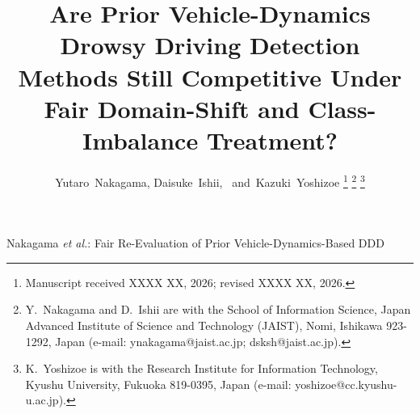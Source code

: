 \documentclass[lettersize,journal]{IEEEtran}
\begin{document}
\title{Are Prior Vehicle-Dynamics Drowsy Driving Detection Methods Still Competitive Under Fair Domain-Shift and Class-Imbalance Treatment?}

\author{Yutaro~Nakagama,
Daisuke~Ishii,~ and~Kazuki~Yoshizoe
\thanks{Manuscript received XXXX XX, 2026; revised XXXX XX, 2026.}%
\thanks{Y.~Nakagama and D.~Ishii are with the School of Information Science, Japan Advanced Institute of Science and Technology (JAIST), Nomi, Ishikawa 923-1292, Japan (e-mail: ynakagama@jaist.ac.jp; dsksh@jaist.ac.jp).}%
\thanks{K.~Yoshizoe is with the Research Institute for Information Technology, Kyushu University, Fukuoka 819-0395, Japan (e-mail: yoshizoe@cc.kyushu-u.ac.jp).}}

%
{Nakagama \MakeLowercase{\textit{et al.}}: Fair Re-Evaluation of Prior Vehicle-Dynamics-Based DDD}

\maketitle
\end{document}

